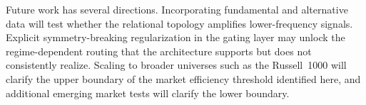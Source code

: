\documentclass[journal]{IEEEtran}
\begin{document}
Future work has several directions. Incorporating fundamental and
alternative data will test whether the relational topology amplifies
lower-frequency signals. Explicit symmetry-breaking regularization in
the gating layer may unlock the regime-dependent routing that the
architecture supports but does not consistently realize. Scaling to
broader universes such as the Russell~1000 will clarify the upper
boundary of the market efficiency threshold identified here, and
additional emerging market tests will clarify the lower boundary.



\end{document}
